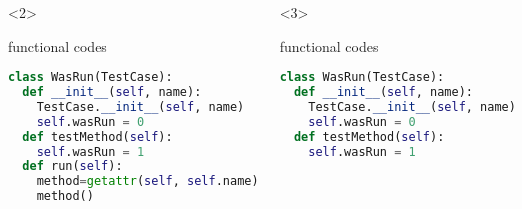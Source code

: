 \documentclass[lualatex]{beamer}
\begin{document}
\begin{frame}[fragile,t]
\begin{columns}[t]
        \begin{onlyenv}<2>
            \begin{block}{functional codes}
                \begin{lstlisting}[language=Python,columns=fullflexible]
class WasRun(TestCase):
  def __init__(self, name):
    TestCase.__init__(self, name)
    self.wasRun = 0
  def testMethod(self):
    self.wasRun = 1
  def run(self):
    method=getattr(self, self.name)
    method()
                \end{lstlisting}
            \end{block}
        \end{onlyenv}

        \begin{onlyenv}<3>
            \begin{block}{functional codes}
                \begin{lstlisting}[language=Python,columns=fullflexible]
class WasRun(TestCase):
  def __init__(self, name):
    TestCase.__init__(self, name)
    self.wasRun = 0
  def testMethod(self):
    self.wasRun = 1
                \end{lstlisting}
            \end{block}
        \end{onlyenv}

    \end{columns}
\end{frame}
\end{document}
